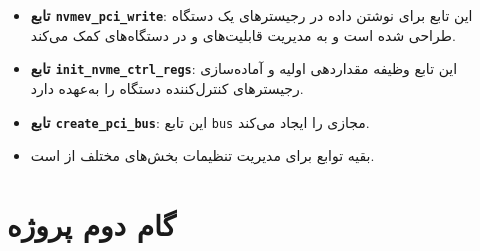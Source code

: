 \documentclass[12pt]{article}
\begin{document}
\begin{itemize}
    \item \textbf{تابع \texttt{nvmev\_pci\_write}}: این تابع برای نوشتن داده در رجیسترهای یک دستگاه  طراحی شده است و به مدیریت قابلیت‌های  و  در دستگاه‌های  کمک می‌کند.
    \item \textbf{تابع \texttt{init\_nvme\_ctrl\_regs}}: این تابع وظیفه مقداردهی اولیه و آماده‌سازی رجیسترهای کنترل‌کننده دستگاه را به‌عهده دارد.
    \item \textbf{تابع \texttt{create\_pci\_bus}}: این تابع \texttt{bus} مجازی  را ایجاد می‌کند.
    \item بقیه توابع برای مدیریت تنظیمات بخش‌های مختلف از  است.
\end{itemize}

\newpage
\section*{گام دوم پروژه}
\end{document}
